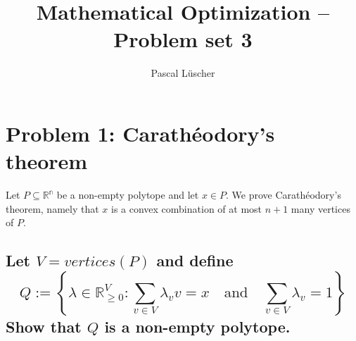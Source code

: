 \documentclass[12pt, a4]{article}
\author{Pascal Lüscher}
\title{Mathematical Optimization – Problem set 3}
\begin{document}
	\section{Problem 1: Carathéodory’s theorem}
	Let $P\subseteq \mathbb{R^n}$ be a non-empty polytope and let $x\in P$. We prove Carathéodory’s theorem, namely that $x$ is a convex combination of at most $n+ 1$ many vertices of $P$.
	
	\subsection{
	Let $V=vertices(P)$ and define 
	$$
	Q := \left\{\lambda\in\mathbb{R}_{\geq0}^V:\sum_{v\in V}\lambda_v v=x \quad\text{and}\quad \sum_{v\in V}\lambda_v =1 \right\}
	$$
	Show that $Q$ is a non-empty polytope.
}
\end{document}
